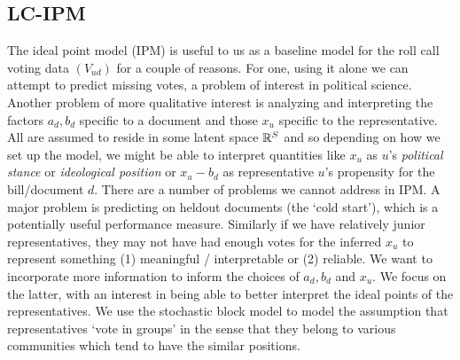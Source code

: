 \documentclass{article}
\begin{document}

\subsection{LC-IPM}

The ideal point model (IPM) is useful to us as a baseline model for the roll call voting data $(V_{ud})$ for a couple of reasons. For one, using it alone we can attempt to predict missing votes, a problem of interest in political science. Another problem of more qualitative interest is analyzing and interpreting the factors $a_d, b_d$ specific to a document and those $x_u$ specific to the representative. All are assumed to reside in some latent space $\mathbb{R}^S$ and so depending on how we set up the model, we might be able to interpret quantities like $x_u$ as $u$'s {\sl political stance} or {\sl ideological position} or $x_u - b_d$ as representative $u$'s propensity for the bill/document $d$. There are a number of problems we cannot address in IPM. A major problem is predicting on heldout documents (the `cold start'), which is a potentially useful performance measure. Similarly if we have relatively junior representatives, they may not have had enough votes for the inferred $x_u$ to represent something (1) meaningful / interpretable or (2) reliable. We want to incorporate more information to inform the choices of $a_d, b_d$ and $x_u$. We focus on the latter, with an interest in being able to better interpret the ideal points of the representatives. We use the stochastic block model to model the assumption that representatives `vote in groups' in the sense that they belong to various communities which tend to have the similar positions.
~\\
\end{document}
